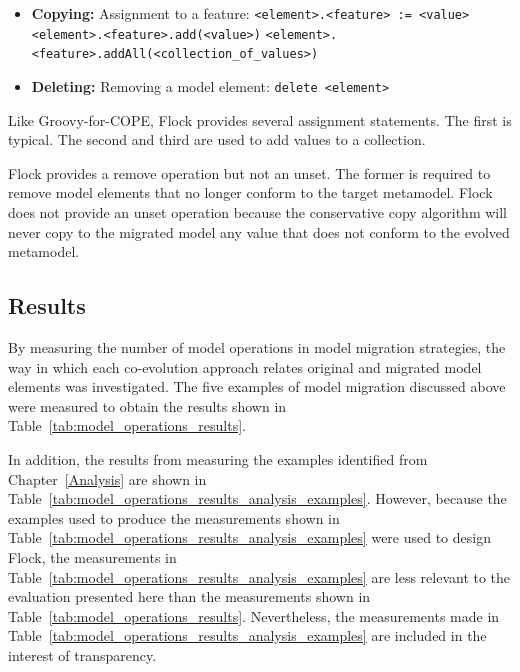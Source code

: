 \begin{itemize}
	\item \textbf{Copying:} Assignment to a feature:
	\subitem \texttt{<element>.<feature> := <value>} 
	\subitem \texttt{<element>.<feature>.add(<value>)}
	\subitem \texttt{<element>.<feature>.addAll(<collection\_of\_values>)}
	
	\item \textbf{Deleting:} Removing a model element:
	\subitem \texttt{delete <element>}
\end{itemize}

Like Groovy-for-COPE, Flock provides several assignment statements. The first is typical. The second and third are used to add values to a collection.

Flock provides a remove operation but not an unset. The former is required to remove model elements that no longer conform to the target metamodel. Flock does not provide an unset operation because the conservative copy algorithm will never copy to the migrated model any value that does not conform to the evolved metamodel. 


\subsection{Results}
\label{subsubsec:quantitive_results}
By measuring the number of model operations in model migration strategies, the way in which each co-evolution approach relates original and migrated model elements was investigated. The five examples of model migration discussed above were measured to obtain the results shown in Table~\ref{tab:model_operations_results}.

In addition, the results from measuring the examples identified from Chapter~\ref{Analysis} are shown in Table~\ref{tab:model_operations_results_analysis_examples}. However, because the examples used to produce the measurements shown in Table~\ref{tab:model_operations_results_analysis_examples} were used to design Flock, the measurements in Table~\ref{tab:model_operations_results_analysis_examples} are less relevant to the evaluation presented here than the measurements shown in Table~\ref{tab:model_operations_results}. Nevertheless, the measurements made in Table~\ref{tab:model_operations_results_analysis_examples} are included in the interest of transparency.

